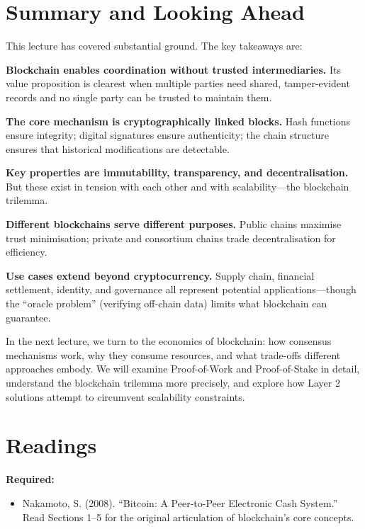 \documentclass[11pt,a4paper]{article}
\begin{document}
\section{Summary and Looking Ahead}

This lecture has covered substantial ground. The key takeaways are:

\textbf{Blockchain enables coordination without trusted intermediaries.} Its value proposition is clearest when multiple parties need shared, tamper-evident records and no single party can be trusted to maintain them.

\textbf{The core mechanism is cryptographically linked blocks.} Hash functions ensure integrity; digital signatures ensure authenticity; the chain structure ensures that historical modifications are detectable.

\textbf{Key properties are immutability, transparency, and decentralisation.} But these exist in tension with each other and with scalability---the blockchain trilemma.

\textbf{Different blockchains serve different purposes.} Public chains maximise trust minimisation; private and consortium chains trade decentralisation for efficiency.

\textbf{Use cases extend beyond cryptocurrency.} Supply chain, financial settlement, identity, and governance all represent potential applications---though the ``oracle problem'' (verifying off-chain data) limits what blockchain can guarantee.

In the next lecture, we turn to the economics of blockchain: how consensus mechanisms work, why they consume resources, and what trade-offs different approaches embody. We will examine Proof-of-Work and Proof-of-Stake in detail, understand the blockchain trilemma more precisely, and explore how Layer 2 solutions attempt to circumvent scalability constraints.

\section*{Readings}

\textbf{Required:}
\begin{itemize}
    \item Nakamoto, S. (2008). ``Bitcoin: A Peer-to-Peer Electronic Cash System.'' Read Sections 1--5 for the original articulation of blockchain's core concepts.
\end{itemize}
\end{document}
